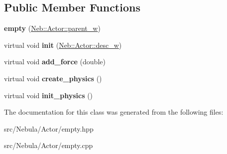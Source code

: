 \subsection*{\-Public \-Member \-Functions}
\begin{DoxyCompactItemize}
\item 
\hypertarget{classNeb_1_1Actor_1_1empty_abb722f20d6fdb41dca959e1a7ec1f7ce}{{\bfseries empty} (\hyperlink{classNeb_1_1weak__ptr}{\-Neb\-::\-Actor\-::parent\-\_\-w})}\label{classNeb_1_1Actor_1_1empty_abb722f20d6fdb41dca959e1a7ec1f7ce}

\item 
\hypertarget{classNeb_1_1Actor_1_1empty_aefdb52ae90478c8df49112cedefcf0b8}{virtual void {\bfseries init} (\hyperlink{classNeb_1_1weak__ptr}{\-Neb\-::\-Actor\-::desc\-\_\-w})}\label{classNeb_1_1Actor_1_1empty_aefdb52ae90478c8df49112cedefcf0b8}

\item 
\hypertarget{classNeb_1_1Actor_1_1empty_ae38621f3ae057ad375ca92af3711a98c}{virtual void {\bfseries add\-\_\-force} (double)}\label{classNeb_1_1Actor_1_1empty_ae38621f3ae057ad375ca92af3711a98c}

\item 
\hypertarget{classNeb_1_1Actor_1_1empty_a76ce00f25471d85dd2469a458491ecfd}{virtual void {\bfseries create\-\_\-physics} ()}\label{classNeb_1_1Actor_1_1empty_a76ce00f25471d85dd2469a458491ecfd}

\item 
\hypertarget{classNeb_1_1Actor_1_1empty_a55c552dcd2d7876b36cf54583ea4be3d}{virtual void {\bfseries init\-\_\-physics} ()}\label{classNeb_1_1Actor_1_1empty_a55c552dcd2d7876b36cf54583ea4be3d}

\end{DoxyCompactItemize}


\-The documentation for this class was generated from the following files\-:\begin{DoxyCompactItemize}
\item 
src/\-Nebula/\-Actor/empty.\-hpp\item 
src/\-Nebula/\-Actor/empty.\-cpp\end{DoxyCompactItemize}
